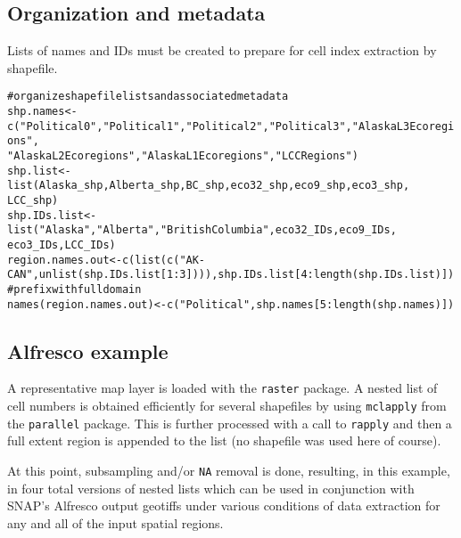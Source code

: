 \documentclass{article}\usepackage[]{graphicx}\usepackage[]{color}
\makeatletter
\newcommand{\hlnum}[1]{\textcolor[rgb]{0.863,0.196,0.184}{#1}}%
\newcommand{\hlstr}[1]{\textcolor[rgb]{0.863,0.196,0.184}{#1}}%
\newcommand{\hlcom}[1]{\textcolor[rgb]{0.345,0.431,0.459}{#1}}%
\newcommand{\hlopt}[1]{\textcolor[rgb]{0.576,0.631,0.631}{#1}}%
\newcommand{\hlstd}[1]{\textcolor[rgb]{0.514,0.58,0.588}{#1}}%
\newcommand{\hlkwb}[1]{\textcolor[rgb]{0.522,0.6,0}{#1}}%
\newcommand{\hlkwd}[1]{\textcolor[rgb]{0.576,0.631,0.631}{#1}}%
\newenvironment{kframe}{%
 \def\at@end@of@kframe{}%
 \ifinner\ifhmode%
  \def\at@end@of@kframe{\end{minipage}}%
  \begin{minipage}{\columnwidth}%
 \fi\fi%
 \def\FrameCommand##1{\hskip\@totalleftmargin \hskip-\fboxsep
 \colorbox{shadecolor}{##1}\hskip-\fboxsep
     \hskip-\linewidth \hskip-\@totalleftmargin \hskip\columnwidth}%
 \MakeFramed {\advance\hsize-\width
   \@totalleftmargin\z@ \linewidth\hsize
   \@setminipage}}%
 {\par\unskip\endMakeFramed%
 \at@end@of@kframe}
\newenvironment{knitrout}{}{} %
\makeatother
\begin{document}
\subsection{Organization and metadata}
Lists of names and IDs must be created to prepare for cell index extraction by shapefile.

\begin{knitrout}
\color{fgcolor}\begin{kframe}
\begin{alltt}
\hlcom{# organize shapefile lists and associated metadata}
\hlstd{shp.names} \hlkwb{<-} \hlkwd{c}\hlstd{(}\hlstr{"Political 0"}\hlstd{,} \hlstr{"Political 1"}\hlstd{,} \hlstr{"Political 2"}\hlstd{,} \hlstr{"Political 3"}\hlstd{,} \hlstr{"Alaska L3 Ecoregions"}\hlstd{,}
    \hlstr{"Alaska L2 Ecoregions"}\hlstd{,} \hlstr{"Alaska L1 Ecoregions"}\hlstd{,} \hlstr{"LCC Regions"}\hlstd{)}
\hlstd{shp.list} \hlkwb{<-} \hlkwd{list}\hlstd{(Alaska_shp, Alberta_shp, BC_shp, eco32_shp, eco9_shp, eco3_shp,}
    \hlstd{LCC_shp)}
\hlstd{shp.IDs.list} \hlkwb{<-} \hlkwd{list}\hlstd{(}\hlstr{"Alaska"}\hlstd{,} \hlstr{"Alberta"}\hlstd{,} \hlstr{"British Columbia"}\hlstd{, eco32_IDs, eco9_IDs,}
    \hlstd{eco3_IDs, LCC_IDs)}
\hlstd{region.names.out} \hlkwb{<-} \hlkwd{c}\hlstd{(}\hlkwd{list}\hlstd{(}\hlkwd{c}\hlstd{(}\hlstr{"AK-CAN"}\hlstd{,} \hlkwd{unlist}\hlstd{(shp.IDs.list[}\hlnum{1}\hlopt{:}\hlnum{3}\hlstd{]))), shp.IDs.list[}\hlnum{4}\hlopt{:}\hlkwd{length}\hlstd{(shp.IDs.list)])}  \hlcom{# prefix with full domain}
\hlkwd{names}\hlstd{(region.names.out)} \hlkwb{<-} \hlkwd{c}\hlstd{(}\hlstr{"Political"}\hlstd{, shp.names[}\hlnum{5}\hlopt{:}\hlkwd{length}\hlstd{(shp.names)])}
\end{alltt}
\end{kframe}
\end{knitrout}

\subsection{Alfresco example}
A representative map layer is loaded with the \texttt{raster} package.
A nested list of cell numbers is obtained efficiently for several shapefiles by using \texttt{mclapply} from the \texttt{parallel} package.
This is further processed with a call to \texttt{rapply} and then a full extent region is appended to the list (no shapefile was used here of course).

At this point, subsampling and/or \texttt{NA} removal is done,
resulting, in this example, in four total versions of nested lists which can be used in conjunction with SNAP's Alfresco output geotiffs
under various conditions of data extraction for any and all of the input spatial regions.
\end{document}
